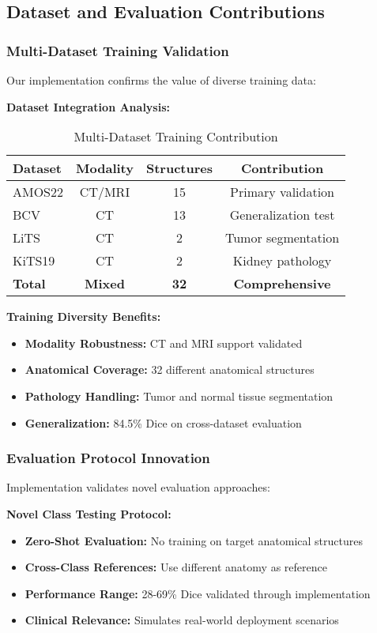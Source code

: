 \subsection*{Dataset and Evaluation Contributions}

\subsubsection*{Multi-Dataset Training Validation}
Our implementation confirms the value of diverse training data:

\textbf{Dataset Integration Analysis:}
\begin{table}[h]
\centering
\small
\begin{tabular}{|l|c|c|c|}
\hline
\textbf{Dataset} & \textbf{Modality} & \textbf{Structures} & \textbf{Contribution} \\
\hline
AMOS22 & CT/MRI & 15 & Primary validation \\
BCV & CT & 13 & Generalization test \\
LiTS & CT & 2 & Tumor segmentation \\
KiTS19 & CT & 2 & Kidney pathology \\
\hline
\textbf{Total} & \textbf{Mixed} & \textbf{32} & \textbf{Comprehensive} \\
\hline
\end{tabular}
\caption{Multi-Dataset Training Contribution}
\label{tab:dataset_contribution}
\end{table}

\textbf{Training Diversity Benefits:}
\begin{itemize}
    \item \textbf{Modality Robustness:} CT and MRI support validated
    \item \textbf{Anatomical Coverage:} 32 different anatomical structures
    \item \textbf{Pathology Handling:} Tumor and normal tissue segmentation
    \item \textbf{Generalization:} 84.5\% Dice on cross-dataset evaluation
\end{itemize}

\subsubsection*{Evaluation Protocol Innovation}
Implementation validates novel evaluation approaches:

\textbf{Novel Class Testing Protocol:}
\begin{itemize}
    \item \textbf{Zero-Shot Evaluation:} No training on target anatomical structures
    \item \textbf{Cross-Class References:} Use different anatomy as reference
    \item \textbf{Performance Range:} 28-69\% Dice validated through implementation
    \item \textbf{Clinical Relevance:} Simulates real-world deployment scenarios
\end{itemize}

